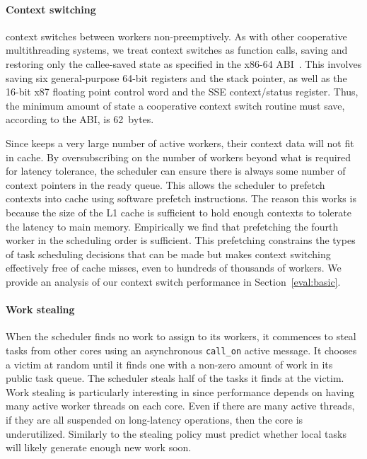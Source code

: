 \paragraph{Context switching} 
\Grappa context switches between workers non-preemptively. As with other
cooperative multithreading systems, we treat context switches as function
calls, saving and restoring only the callee-saved state as specified in the
x86-64 ABI~\cite{amd64:abi:2012}. This involves saving six general-purpose
64-bit registers and the stack pointer, as well as the 16-bit x87 floating
point control word and the SSE context/status register. Thus, the minimum
amount of state a cooperative context switch routine must save, according to
the ABI, is 62~bytes.

Since \Grappa keeps a very large number of active workers, their context data
will not fit in cache. By oversubscribing on the number of workers
beyond what is required for latency tolerance, the scheduler can
ensure there is always some number of context pointers in the ready
queue. This allows the scheduler to prefetch contexts into
cache using software prefetch instructions. The reason this works is because the size of the L1 cache is
sufficient to hold enough contexts to tolerate the latency to main
memory. Empirically we find that prefetching the fourth worker in the scheduling order is
sufficient. This prefetching constrains the types of task scheduling
decisions that can be made but makes context switching effectively
free of cache misses, even to hundreds
of thousands of workers. We provide an analysis of our context switch
performance in Section~\ref{eval:basic}.


\paragraph{Work stealing} 
When the scheduler finds no work to assign to its workers, it commences to
steal tasks from other cores using an asynchronous \texttt{call\_on} active
message. It chooses a victim at random until it finds one with a non-zero
amount of work in its public task queue. The scheduler steals half of the
tasks it finds at the victim. Work stealing is particularly interesting in
\Grappa since performance depends on having many active worker threads on each
core. Even if there are many active threads, if they are all suspended on
long-latency operations, then the core is underutilized. Similarly to
\cite{the_hierarchical_workstealing} the
stealing policy must predict whether local tasks will likely
generate enough new work soon.

